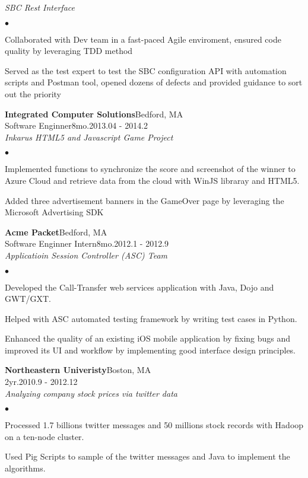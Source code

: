 \documentclass[10pt]{article}
\newcommand{\company}[5]{
    \large{\textbf{#1}}\hfill \small{#3}\\
    #2\hfill \small{#4}\small{#5}\\
}
\newcommand{\project}[1]{\checkmark\normalsize{{\emph{#1}}}\\}
\newenvironment{achievements}
    {\begin{list}
        {$\bullet$}{\topsep 0pt \itemsep -1pt}} 
    {\end{list}}
\begin{document}
  \project{SBC Rest Interface}
  \begin{achievements}
\item Collaborated with Dev team in a fast-paced Agile enviroment, ensured code quality by leveraging TDD method
\item Served as the test expert to test the SBC configuration API with automation scripts and Postman tool, opened dozens of defects and provided guidance to sort out the priority
  \end{achievements}

  \company{Integrated Computer Solutions}{Software Enginner}{Bedford, MA}{8mo.}{2013.04 - 2014.2}
    \project{Inkarus HTML5 and Javascript Game Project}
  \begin{achievements}
\item Implemented functions to synchronize the score and screenshot of the winner to Azure Cloud and retrieve data from the cloud with WinJS libraray and HTML5.
\item Added three advertisement banners in the GameOver page by leveraging the Microsoft Advertising SDK
  \end{achievements}

  \company{Acme Packet}{Software Enginner Intern}{Bedford, MA}{8mo.}{2012.1 - 2012.9}
  \project{Applicatioin Session Controller (ASC) Team}
  \begin{achievements}
\item Developed the Call-Transfer web services application with Java, Dojo and GWT/GXT.
\item Helped with ASC automated testing framework by writing test cases in Python.
\item Enhanced the quality of an existing iOS mobile application by fixing bugs and improved its UI and workflow by implementing good interface design principles.
  \end{achievements}

  \company{Northeastern Univeristy}{}{Boston, MA}{2yr.}{2010.9 - 2012.12}

  \project{Analyzing company stock prices via twitter data}
  \begin{achievements}
\item Processed 1.7 billions twitter messages and 50 millions stock records with Hadoop on a ten-node cluster.
\item Used Pig Scripts to sample of the twitter messages and Java to implement the algorithms.
  \end{achievements}
\end{document}
